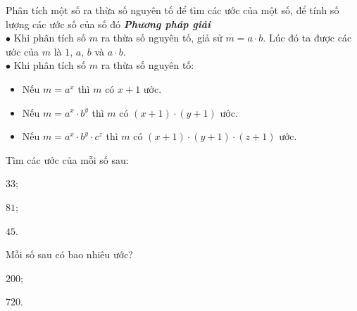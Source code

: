 \begin{dang}{Phân tích một số ra thừa số nguyên tố để tìm các ước của một số, để tính số lượng các ước số của số đó}
	\textbf{\textit{Phương pháp giải}} \\
	$\bullet$ Khi phân tích số $m$ ra thừa số nguyên tố, giả sử $m = a \cdot b$. Lúc đó ta được các ước của $m$ là $1$, $a$, $b$ và $a \cdot b$.\\
	$\bullet$ Khi phân tích số $m$ ra thừa số nguyên tố:
	\begin{itemize}
		\item  Nếu $m = a^x$ thì $m$ có $x+1$ ước.
		\item  Nếu $m = a^x \cdot b^y$ thì $m$ có $(x+1)\cdot(y+1)$ ước.
		\item  Nếu $m = a^x \cdot b^y \cdot c^z$ thì $m$ có $(x+1) \cdot (y+1) \cdot (z+1)$ ước.
	\end{itemize}
\end{dang}
\begin{vd}%
	Tìm các ước của mỗi số sau:
	\begin{enumEX}[a)]{3}
		\item $33$;
		\item $81$;
		\item $45$.
	\end{enumEX}
\end{vd}
\begin{vd}%
	Mỗi số sau có bao nhiêu ước?
	\begin{enumEX}[a)]{2}
		\item  $200$;
		\item  $720$.
	\end{enumEX}
\end{vd}
